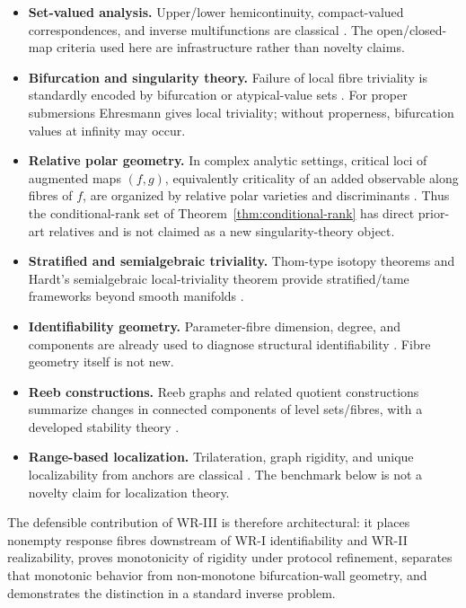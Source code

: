 \documentclass[11pt]{article}
\begin{document}
\begin{itemize}
\item \textbf{Set-valued analysis.} Upper/lower hemicontinuity, compact-valued
correspondences, and inverse multifunctions are classical
\cite{AubinFrankowska}. The open/closed-map criteria used here are
infrastructure rather than novelty claims.

\item \textbf{Bifurcation and singularity theory.} Failure of local fibre
triviality is standardly encoded by bifurcation or atypical-value sets
\cite{Klepczarek2023,DinhJelonek2021}. For proper submersions Ehresmann gives
local triviality; without properness, bifurcation values at infinity may occur.

\item \textbf{Relative polar geometry.} In complex analytic settings, critical
loci of augmented maps \((f,g)\), equivalently criticality of an added
observable along fibres of \(f\), are organized by relative polar varieties
and discriminants \cite{Massey2008}. Thus the conditional-rank set of
Theorem~\ref{thm:conditional-rank} has direct prior-art relatives and is not
claimed as a new singularity-theory object.

\item \textbf{Stratified and semialgebraic triviality.} Thom-type isotopy
theorems and Hardt's semialgebraic local-triviality theorem provide
stratified/tame frameworks beyond smooth manifolds
\cite{DinhJelonek2021,Hardt1980}.

\item \textbf{Identifiability geometry.} Parameter-fibre dimension, degree, and
components are already used to diagnose structural identifiability
\cite{BatesHauensteinMeshkat2019}. Fibre geometry itself is not new.

\item \textbf{Reeb constructions.} Reeb graphs and related quotient
constructions summarize changes in connected components of level sets/fibres,
with a developed stability theory \cite{BauerLandiMemoli2021}.

\item \textbf{Range-based localization.} Trilateration, graph rigidity, and
unique localizability from anchors are classical
\cite{AspnesEtAl2006,AndersonEtAl2010}. The benchmark below is not a novelty
claim for localization theory.
\end{itemize}

The defensible contribution of WR-III is therefore architectural: it places
nonempty response fibres downstream of WR-I identifiability and WR-II
realizability, proves monotonicity of rigidity under protocol refinement,
separates that monotonic behavior from non-monotone bifurcation-wall geometry,
and demonstrates the distinction in a standard inverse problem.
\end{document}
